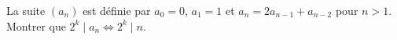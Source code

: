 La suite $(a_n)$ est définie par $a_0 = 0$, $a_1 = 1$ et $a_n = 2a_{n-1} + a_{n-2}$ pour $n > 1$. Montrer que $2^k \mid a_n \Leftrightarrow 2^k \mid n$.
